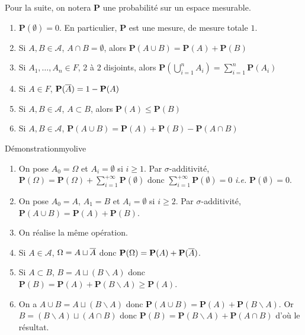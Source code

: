     Pour la suite, on notera $\mathbf{P}$ une probabilité sur un espace mesurable.

    \begin{prop}{}{}
        \begin{enumerate}
            \item $\mathbf{P}(\emptyset) = 0$. En particulier, $\mathbf{P}$ est une mesure, de mesure totale $1$.
            \item Si $A,B \in \mathcal{A}$, $A \cap B = \emptyset$, alors $\mathbf{P}(A \cup B) = \mathbf{P}(A) + \mathbf{P}(B)$
            \item Si $A_1, \ldots, A_n \in F$, 2 à 2 disjoints, alors $\mathbf{P}\left(\bigcup_{i=1}^n A_i\right) = \sum_{i =1}^n \mathbf{P}(A_i)$
            \item Si $A \in F$, $\mathbf{P}(\overline{A}) = 1 - \mathbf{P}(A)$
            \item Si $A, B \in \mathcal{A}$, $A \subset B$, alors $\mathbf{P}(A) \leq \mathbf{P}(B)$
            \item Si $A, B \in \mathcal{A}$, $\mathbf{P}(A \cup B) = \mathbf{P}(A) + \mathbf{P}(B) - \mathbf{P}(A \cap B)$
        \end{enumerate}
    \end{prop}

    \begin{demo}{Démonstration}{myolive}
        \begin{enumerate}
            \item On pose $A_0 = \Omega$ et $A_i = \emptyset$ si $i \geq 1$. Par $\sigma$-additivité, $\mathbf{P}(\Omega) = \mathbf{P}(\Omega) + \sum_{i=1}^{+\infty} \mathbf{P}(\emptyset)$ donc $\sum_{i=1}^{+\infty} \mathbf{P}(\emptyset) = 0$ \textit{i.e.} $\mathbf{P}(\emptyset) = 0$.
            \item On pose $A_0 = A$, $A_1 = B$ et $A_i = \emptyset$ si $i \geq 2$. Par $\sigma$-additivité, $\mathbf{P}(A \cup B) = \mathbf{P}(A) + \mathbf{P}(B)$.
            \item On réalise la même opération.
            \item Si $A \in \mathcal{A}$, $\Omega = A \sqcup \overline{A}$ donc $\mathbf{P}(\Omega) = \mathbf{P}(A) + \mathbf{P}(\overline{A})$.
            \item Si $A \subset B$, $B = A \sqcup (B \backslash A)$ donc $\mathbf{P}(B) = \mathbf{P}(A) + \mathbf{P}(B \backslash A) \geq \mathbf{P}(A)$.
            \item On a $A \cup B = A \sqcup (B \backslash A)$ donc $\mathbf{P}(A \cup B) = \mathbf{P}(A) + \mathbf{P}(B \backslash A)$. Or $B = (B \backslash A) \sqcup (A \cap B)$ donc $\mathbf{P}(B) = \mathbf{P}(B \backslash A) + \mathbf{P}(A \cap B)$ d’où le résultat.
        \end{enumerate}
    \end{demo}

